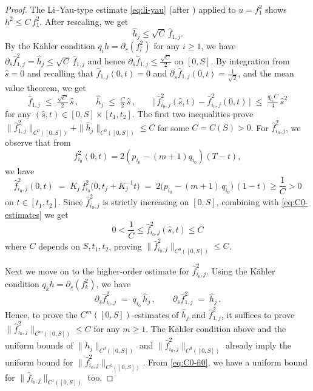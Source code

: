 \documentclass[11pt]{amsart}
\theoremstyle{plain}
\numberwithin{equation}{section}
\theoremstyle{definition}
\theoremstyle{remark}
\begin{document}
\begin{proof}
The Li--Yau-type estimate \eqref{eq:li-yau} (after \cite{LY}) applied to $u = f_1^2$ shows $h^2 \leq C \, f_1^2$. After rescaling, we get
\[\hat{h}_j \leq \sqrt{C} \, \hat{f}_{1, j}.\]
By the K\"ahler condition $q_ih = \partial_s(f_i^2)$ for any $i \geq 1$, we have $\partial_{\hat{s}} \hat{f}_{1, j}^2 = \hat{h}_j \leq \sqrt{C} \, \hat{f}_{1, j}$ and hence $\partial_{\hat{s}}\hat{f}_{1,j} \leq \frac{\sqrt{C}}{2}$ on $[0,S]$. By integration from $\hat{s} = 0$ and recalling that $\hat{f}_{1, j} ( 0, t) = 0$ and $\partial_{\hat{s}}\hat{f}_{1,j}(0,t) = \frac{1}{\sqrt{2}}$, and the mean value theorem, we get
\begin{equation}\label{eq:C0-estimates}
\hat{f}_{1, j} \;\leq\; \tfrac{\sqrt{C}}{2} \, \hat{s} \,, \qquad \hat{h}_j \;\leq\; \tfrac{C}{2} \, \hat{s} \,, \qquad \big| \, \hat{f}_{i_0, j}^2 ( \hat{s}, t ) - \hat{f}_{i_0, j}^2 ( 0, t ) \, \big| \;\leq\; \tfrac{q_{i_0} C}{4} \, \hat{s}^2
\end{equation}
for any $(\hat{s},t) \in [0,S] \times [t_1,t_2]$. The first two inequalities prove $\|\hat{f}_{1,j}^2\|_{C^0([0,S])} + \|\hat{h}_j\|_{C^0([0,S])} \leq C$ for some $C = C(S) > 0$. For $\hat{f}_{i_0,j}^2$, we observe that from
\[f_{i_0}^2(0,t) = 2(p_{i_0}-(m+1)q_{i_0})(T-t),\]
we have
\begin{equation*}
\hat{f}_{i_0, j}^2(0,t) \;=\; K_j \, f_{i_0}^2 \big(0, t_j + K_j^{-1} t \big) \;=\; 2 \big( p_{i_0} - ( m + 1 ) \, q_{i_0} \big) \,(1 - t) \geq \frac{1}{C} > 0
\end{equation*}
on $t \in [t_1,t_2]$. Since $\hat{f}_{i_0,j}^2$ is strictly increasing on $[0,S]$, combining with \eqref{eq:C0-estimates} we get
\begin{equation}\label{eq:C0-fi0}
0 < \frac{1}{C} \leq \hat{f}_{i_0,j}^2 (\hat{s},t) \leq C
\end{equation}
where $C$ depends on $S, t_1, t_2$, proving $\big\|\hat{f}_{i_0,j}^2\big\|_{C^0([0,S])} \leq C$.

Next we move on to the higher-order estimate for $\hat{f}_{i_0,j}^2$. Using the K\"ahler condition $q_k h = \partial_s (f_k^2)$, we have
\begin{equation*}
\partial_{\hat{s}} \hat{f}_{i_0, j}^2 \;=\; q_{i_0} \, \hat{h}_j \,, \qquad \partial_{\hat{s}} \hat{f}_{1, j}^2 \;=\; \hat{h}_j \,.
\end{equation*}
Hence, to prove the $C^m([0,S])$-estimates of $\hat{h}_j$ and $\hat{f}_{1,j}^2$, it suffices to prove $\big\|\hat{f}_{i_0,j}^2\big\|_{C^m([0,S])} \leq C$ for any $m \geq 1$. The K\"ahler condition above and the uniform bounds of $\|\hat{h}_j\|_{C^0([0,S])}$ and $\|\hat{f}_{i_0,j}^2\|_{C^0([0,S])}$ already imply the uniform bound for $\big\|\hat{f}_{i_0,j}^2\big\|_{C^1([0,S])}$. From \eqref{eq:C0-fi0}, we have a uniform bound for $\big\|\hat{f}_{i_0,j}\big\|_{C^1([0,S])}$ too.


\end{proof}
\end{document}
